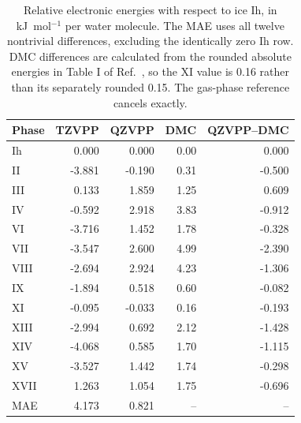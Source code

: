 \begin{table}[htbp]
\centering\small
\caption{Relative electronic energies with respect to ice Ih, in kJ~mol$^{-1}$ per water molecule. The MAE uses all twelve nontrivial differences, excluding the identically zero Ih row. DMC differences are calculated from the rounded absolute energies in Table I of Ref.~, so the XI value is 0.16 rather than its separately rounded 0.15. The gas-phase reference cancels exactly.}
\label{tab:ice-relative}
\begin{tabular}{lrrrr}
\toprule
Phase & TZVPP & QZVPP & DMC & QZVPP--DMC\\
\midrule
Ih & 0.000 & 0.000 & 0.00 & 0.000\\
II & -3.881 & -0.190 & 0.31 & -0.500\\
III & 0.133 & 1.859 & 1.25 & 0.609\\
IV & -0.592 & 2.918 & 3.83 & -0.912\\
VI & -3.716 & 1.452 & 1.78 & -0.328\\
VII & -3.547 & 2.600 & 4.99 & -2.390\\
VIII & -2.694 & 2.924 & 4.23 & -1.306\\
IX & -1.894 & 0.518 & 0.60 & -0.082\\
XI & -0.095 & -0.033 & 0.16 & -0.193\\
XIII & -2.994 & 0.692 & 2.12 & -1.428\\
XIV & -4.068 & 0.585 & 1.70 & -1.115\\
XV & -3.527 & 1.442 & 1.74 & -0.298\\
XVII & 1.263 & 1.054 & 1.75 & -0.696\\
\midrule
MAE & 4.173 & 0.821 & -- & --\\
\bottomrule
\end{tabular}
\end{table}
